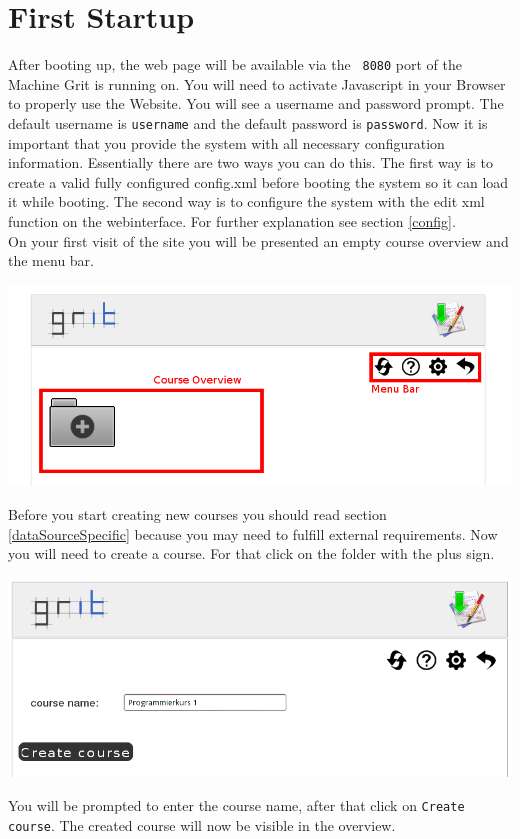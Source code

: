 \documentclass[10pt,a4paper, titlepage, toc=idx]{scrreprt}
\theoremstyle{definition}
\theoremstyle{plain}
\newcommand*{\product}{Grit}
\begin{document}
	\section{First Startup}
	After booting up, the web page will be available via the {\tt
          8080} port of the Machine \product{} is running on. You will
        need to activate Javascript in your Browser to properly use
        the Website.  You will see a username and password prompt. The
        default username is \texttt{username} and the default password is
        \texttt{password}. Now it is important that you provide the system with all necessary configuration information. Essentially there are two ways you can do this. The first way is to create a valid fully configured config.xml before booting the system so it can load it while booting. The second way is to configure the system with the edit xml function on the webinterface. For further explanation see section \ref{config}.\\
	On your first visit of the site you will be presented an empty
        course overview and the menu bar.
	\begin{center}
          \includegraphics[width=.6\textwidth]{pictures/home.png}
	\end{center}
	Before you start creating new courses you should read section \ref{dataSourceSpecific} because you may need to fulfill external requirements. Now you will need to create a course. For that click on the
        folder with the plus sign.
	\begin{center}
          \includegraphics[width=.55\textwidth]{pictures/create_course.png}
	\end{center}
	You will be prompted to enter the course name, after that
        click on {\tt Create course}. The created course will now be
        visible in the overview.
\end{document}
